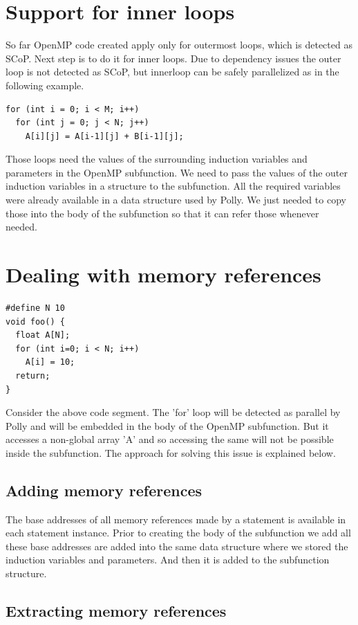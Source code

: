 \section{Support for inner loops}

So far OpenMP code created apply only for outermost loops, which is detected as SCoP. Next step is to do it for
inner loops. Due to dependency issues the outer loop is not detected as SCoP, but innerloop can be safely
parallelized as in the following example.
{\footnotesize
\begin{lstlisting}
for (int i = 0; i < M; i++)
  for (int j = 0; j < N; j++)
    A[i][j] = A[i-1][j] + B[i-1][j];
\end{lstlisting}
}
Those loops need the values of the surrounding induction variables and parameters in the OpenMP subfunction. We need
to pass the values of the outer induction variables in a structure to the subfunction. All the required variables
were already available in a data structure used by Polly. We just needed to copy those into the body of the subfunction
so that it can refer those whenever needed.

\section{Dealing with memory references}
{\footnotesize
\begin{lstlisting}
#define N 10
void foo() {
  float A[N];
  for (int i=0; i < N; i++)
    A[i] = 10;
  return;
}
\end{lstlisting}
}
Consider the above code segment. The 'for' loop will be detected as parallel by Polly and will be embedded in the
body of the OpenMP subfunction. But it accesses a non-global array 'A' and so accessing the same will not be possible inside
the subfunction. The approach for solving this issue is explained below.

\subsection{Adding memory references}

The base addresses of all memory references made by a statement is available in each statement instance. Prior to creating the body
of the subfunction we add all these base addresses are added into the same data structure where we stored the induction variables and parameters.
And then it is added to the subfunction structure.

\subsection{Extracting memory references}

